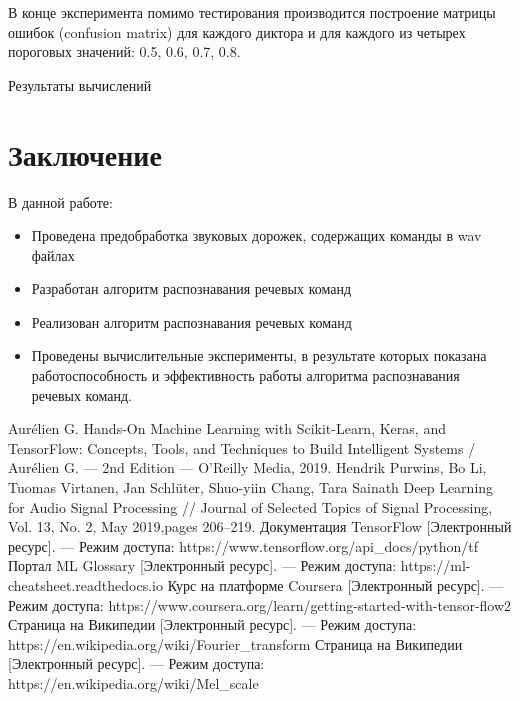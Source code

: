 \documentclass[14pt]{article}
\begin{document}
В конце эксперимента помимо тестирования производится построение матрицы ошибок (confusion matrix) для каждого диктора и для каждого из четырех пороговых значений: 0.5, 0.6, 0.7, 0.8.
\\

\begin{table}
\centering
{}
\caption{Результаты вычислений}
\end{table}


\newpage


\section*{Заключение}
В данной работе:
\begin{itemize}[leftmargin=2cm]
\item Проведена предобработка звуковых дорожек, содержащих команды в wav файлах
\item Разработан алгоритм распознавания речевых команд
\item Реализован алгоритм распознавания речевых команд
\item Проведены вычислительные эксперименты, в результате которых	 показана работоспособность и эффективность работы алгоритма распознавания речевых команд.
\end{itemize}
\newpage

\begin{thebibliography}{3}
Aurélien G. Hands-On Machine Learning with Scikit-Learn, Keras, and TensorFlow: Concepts, Tools, and Techniques to Build Intelligent Systems / Aurélien G. --- 2nd Edition --- O'Reilly Media, 2019.
Hendrik Purwins, Bo Li, Tuomas Virtanen, Jan Schlüter, Shuo-yiin Chang, Tara Sainath Deep Learning for Audio Signal Processing // Journal  of  Selected  Topics  of  Signal  Processing,  Vol.  13,  No.  2,  May  2019,pages 206–219.
Документация TensorFlow [Электронный ресурс]. --- Режим доступа: https://www.tensorflow.org/api\_docs/python/tf
Портал ML Glossary [Электронный ресурс]. --- Режим доступа: https://ml-cheatsheet.readthedocs.io
Курс на платформе Coursera [Электронный ресурс]. --- Режим доступа: https://www.coursera.org/learn/getting-started-with-tensor-flow2
Страница на Википедии [Электронный ресурс]. --- Режим доступа: https://en.wikipedia.org/wiki/Fourier\_transform
Страница на Википедии [Электронный ресурс]. --- Режим доступа: https://en.wikipedia.org/wiki/Mel\_scale

\end{thebibliography}
\newpage
\end{document}

